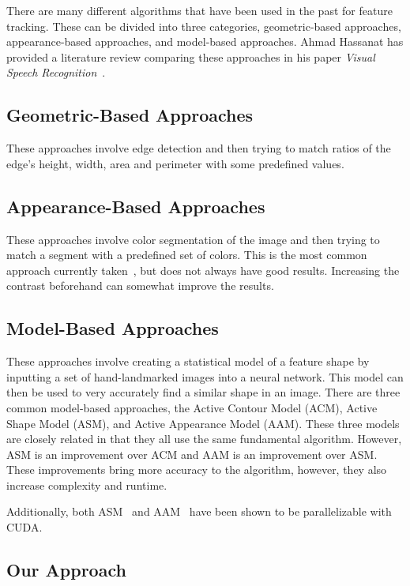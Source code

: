 There are many different algorithms that have been used in the past for feature tracking. 
These can be divided into three categories, geometric-based approaches, appearance-based approaches, and model-based approaches. Ahmad Hassanat has provided a literature review comparing these approaches in his paper \textit{Visual Speech Recognition}~\cite{Hassanat14}.

\subsection{Geometric-Based Approaches}

These approaches involve edge detection and then trying to match ratios of the edge's height, width, area and perimeter with some predefined values.

\subsection{Appearance-Based Approaches}

These approaches involve color segmentation of the image and then trying to match a segment with a predefined set of colors. 
This is the most common approach currently taken~\cite{Stillittano13}\cite{Yang09}, but does not always have good results. Increasing the contrast beforehand can somewhat improve the results.

\subsection{Model-Based Approaches}

These approaches involve creating a statistical model of a feature shape by inputting a set of hand-landmarked images into a neural network.
This model can then be used to very accurately find a similar shape in an image. 
There are three common model-based approaches, the Active Contour Model (ACM), Active Shape Model (ASM), and Active Appearance Model (AAM).
These three models are closely related in that they all use the same fundamental algorithm. However, ASM is an improvement over ACM and AAM is an improvement over ASM. These improvements bring more accuracy to the algorithm, however, they also increase complexity and runtime.

Additionally, both ASM~\cite{Li09} and AAM~\cite{Wang14} have been shown to be parallelizable with CUDA.

\subsection{Our Approach}

